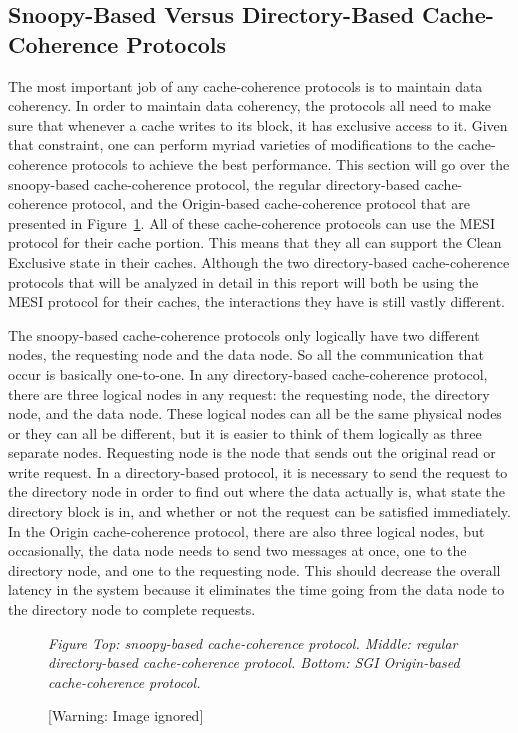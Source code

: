 \documentclass[letterpaper]{article}
\newcounter{Figure}
\renewcommand\theFigure{\arabic{Figure}}
\begin{document}
\subsection[Snoopy{}-Based Versus Directory{}-Based Cache{}-Coherence Protocols]{\rmfamily Snoopy-Based Versus Directory-Based Cache-Coherence Protocols}
{\ttfamily
\textrm{The most important job of any cache-coherence protocols is to maintain data coherency. In order to maintain data coherency, the protocols all need to make sure that whenever a cache writes to its block, it has exclusive access to it. Given that constraint, one can perform myriad varieties of modifications to the cache-coherence protocols to achieve the best performance. This section will go over the snoopy-based cache-coherence protocol, the regular directory-based cache-coherence protocol, and the Origin-based cache-coherence protocol that are presented in }\textrm{Figure~\ref{seq:refFigure0}}\textrm{. All of these cache-coherence protocols can use the MESI protocol for their cache portion. This means that they all can support the Clean Exclusive state in their caches. Although the two directory-based cache-coherence protocols that will be analyzed in detail in this report will both }\textrm{be using the MESI protocol for their caches, the interactions they have is still vastly different.}}

The snoopy-based cache-coherence protocols only logically have two different nodes, the requesting node and the data node. So all the communication that occur is basically one-to-one. In any directory-based cache-coherence protocol, there are three logical nodes in any request: the requesting node, the directory node, and the data node. These logical nodes can all be the same physical nodes or they can all be different, but it is easier to think of them logically as three separate nodes. Requesting node is the node that sends out the original read or write request. In a directory-based protocol, it is necessary to send the request to the directory node in order to find out where the data actually is, what state the directory block is in, and whether or not the request can be satisfied immediately. In the Origin cache-coherence protocol, there are also three logical nodes, but occasionally, the data node needs to send two messages at once, one to the directory node, and one to the requesting node. This should decrease the overall latency in the system because it eliminates the time going from the data node to the directory node to complete requests.

\begin{figure}
\centering
\begin{minipage}{6.5in}
{\itshape
Figure {\theFigure\label{seq:refFigure0}} Top: snoopy-based cache-coherence protocol. Middle: regular directory-based cache-coherence protocol. Bottom: SGI Origin-based cache-coherence protocol.}

 [Warning: Image ignored] %

\bigskip
\end{minipage}
\end{figure}
\end{document}
